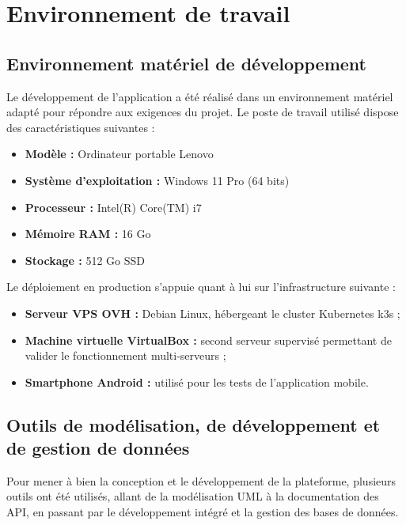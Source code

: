 \section{Environnement de travail}

\subsection{Environnement matériel de développement}
Le développement de l'application a été réalisé dans un environnement matériel adapté
pour répondre aux exigences du projet. Le poste de travail utilisé dispose des
caractéristiques suivantes :

\begin{itemize}[label=]
    \item \textbf{Modèle :} Ordinateur portable Lenovo
    \item \textbf{Système d'exploitation :} Windows 11 Pro (64 bits)
    \item \textbf{Processeur :} Intel(R) Core(TM) i7
    \item \textbf{Mémoire RAM :} 16 Go
    \item \textbf{Stockage :} 512 Go SSD
\end{itemize}

Le déploiement en production s'appuie quant à lui sur l'infrastructure suivante :

\begin{itemize}[label=]
    \item \textbf{Serveur VPS OVH :} Debian Linux, hébergeant le cluster Kubernetes k3s ;
    \item \textbf{Machine virtuelle VirtualBox :} second serveur supervisé permettant de
          valider le fonctionnement multi-serveurs ;
    \item \textbf{Smartphone Android :} utilisé pour les tests de l'application mobile.
\end{itemize}

\subsection{Outils de modélisation, de développement et de gestion de données}
Pour mener à bien la conception et le développement de la plateforme, plusieurs outils
ont été utilisés, allant de la modélisation UML à la documentation des API, en passant
par le développement intégré et la gestion des bases de données.

